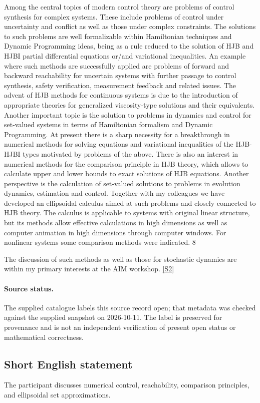\documentclass[11pt]{article}
\newcommand{\sref}[2]{\hyperlink{source:#1:#2}{[S#2]}}
\begin{document}
Among the central topics of modern control theory are problems of control synthesis for complex systems. These include problems of control under uncertainty and conflict as well as those under complex constraints. The solutions to such problems are well formalizable within Hamiltonian techniques and Dynamic Programming ideas, being as a rule reduced to the solution of HJB and HJBI partial differential equations or/and variational inequalities. An example where such methods are successfully applied are problems of forward and backward reachability for uncertain systems with further passage to control synthesis, safety verification, measurement feedback and related issues. The advent of HJB methods for continuous systems is due to the introduction of appropriate theories for generalized viscosity-type solutions and their equivalents. Another important topic is the solution to problems in dynamics and control for set-valued systems in terms of Hamiltonian formalism and Dynamic Programming. At present there is a sharp necessity for a breakthrough in numerical methods for solving equations and variational inequalities of the HJB-HJBI types motivated by problems of the above. There is also an interest in numerical methods for the comparison principle in HJB theory, which allows to calculate upper and lower bounds to exact solutions of HJB equations. Another perspective is the calculation of set-valued solutions to problems in evolution dynamics, estimation and control. Together with my colleagues we have developed an ellipsoidal calculus aimed at such problems and closely connected to HJB theory. The calculus is applicable to systems with original linear structure, but its methods allow effective calculations in high dimensions as well as computer animation in high dimensions through computer windows. For nonlinear systems some comparison methods were indicated. 8

The discussion of such methods as well as those for stochastic dynamics are within my primary interests at the AIM workshop. \sref{20001170}{2}
\paragraph{Source status.}
The supplied catalogue labels this source record open; that metadata was checked against the supplied snapshot on 2026-10-11. The label is preserved for provenance and is not an independent verification of present open status or mathematical correctness.
\subsection{Short English statement}
The participant discusses numerical control, reachability, comparison principles, and ellipsoidal set approximations.
\end{document}

